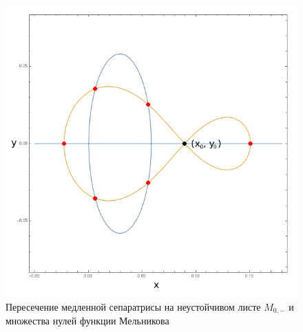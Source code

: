 \begin{figure}[H]
\centering
\includegraphics[scale=0.45]{../img/melnikov-separatrix.png}
\caption{Пересечение медленной сепаратрисы на неустойчивом листе $M_{0,-}$ и множества нулей функции Мельникова}
\label{sep_zero}
\end{figure}
